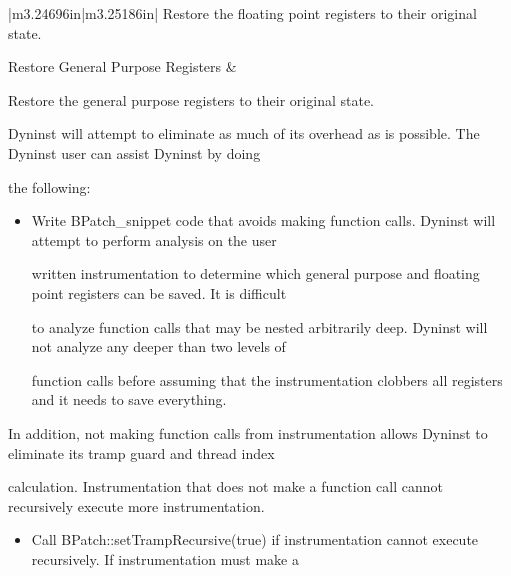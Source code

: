{{{\begin{flushleft}
\begin{supertabular}{|m{3.24696in}|m{3.25186in}|}
{ Restore the floating point registers to their original state.}\\\hline

{ Restore General Purpose Registers} &

{ Restore the general purpose registers to their original state.}\\\hline

\end{supertabular}

\end{flushleft}

{

Dyninst will attempt to eliminate as much of its overhead as is possible. The Dyninst user can assist Dyninst by doing

the following:}





\bigskip



\begin{itemize}

\item {

Write BPatch_snippet code that avoids making function calls. Dyninst will attempt to perform analysis on the user

written instrumentation to determine which general purpose and floating point registers can be saved. It is difficult

to analyze function calls that may be nested arbitrarily deep. Dyninst will not analyze any deeper than two levels of

function calls before assuming that the instrumentation clobbers all registers and it needs to save everything.}

\end{itemize}

{

In addition, not making function calls from instrumentation allows Dyninst to eliminate its tramp guard and thread index

calculation. Instrumentation that does not make a function call cannot recursively execute more instrumentation.

}



\begin{itemize}

\item {

Call BPatch::setTrampRecursive(true) if instrumentation cannot execute recursively. If instrumentation must make a

}
\end{itemize}}}}
